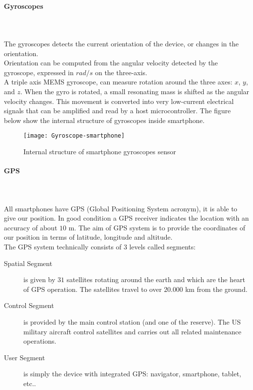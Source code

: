 \documentclass{standalone}
\begin{document}
\paragraph{{\Large Gyroscopes}}\leavevmode\\\\
The gyroscopes detects the current orientation of the device, or
changes in the orientation.\\ Orientation can be computed from the
angular velocity detected by the gyroscope, expressed in $rad/s$ on the three-axis.\\ 
A triple axis MEMS gyroscope, can measure rotation around the three axes: $x$, $y$, and $z$.
When the gyro is rotated, a small resonating mass is shifted as the angular velocity changes. This movement is converted into very low-current electrical signals that can be amplified and read by a host microcontroller.
The figure below show the internal structure of gyroscopes inside smartphone.


\vspace{1cm}
\begin{figure}[h]
\centering
\texttt{[image: Gyroscope-smartphone]}
\caption{Internal structure of smartphone gyroscopes sensor}
\label{fig:Sample smartphone accelerometer sensors}
\end{figure}
\clearpage
\paragraph{{\Large GPS}}\leavevmode\\\\
All smartphones have GPS (Global Positioning System acronym), it is able to give our position. In good condition a GPS receiver indicates the location with an accuracy of about $10$ \si{\meter}. The aim of GPS system is to provide the coordinates of our position in terms of latitude, longitude and altitude.\\
The GPS system technically consists of 3 levels called segments:
\begin{description}
\item [Spatial Segment] is given by $31$ satellites rotating around the earth and which are the heart of GPS operation. The satellites travel to over $20.000$ \si{\km} from the ground.
\item [Control Segment] is provided by the main control station (and one of the reserve). The US military aircraft control satellites and carries out all related maintenance operations.
\item [User Segment] is simply the device with integrated GPS: navigator, smartphone, tablet, etc..
\end{description}
\end{document}
